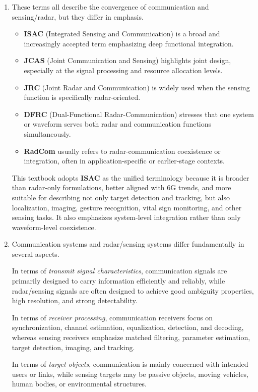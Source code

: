\begin{enumerate}[label=\textbf{\arabic*.}, leftmargin=*]
    \item 
    These terms all describe the convergence of communication and sensing/radar, but they differ in emphasis.

    \begin{itemize}
        \item \textbf{ISAC} (Integrated Sensing and Communication) is a broad and increasingly accepted term emphasizing deep functional integration.
        \item \textbf{JCAS} (Joint Communication and Sensing) highlights joint design, especially at the signal processing and resource allocation levels.
        \item \textbf{JRC} (Joint Radar and Communication) is widely used when the sensing function is specifically radar-oriented.
        \item \textbf{DFRC} (Dual-Functional Radar-Communication) stresses that one system or waveform serves both radar and communication functions simultaneously.
        \item \textbf{RadCom} usually refers to radar-communication coexistence or integration, often in application-specific or earlier-stage contexts.
    \end{itemize}

    This textbook adopts \textbf{ISAC} as the unified terminology because it is broader than radar-only formulations, better aligned with 6G trends, and more suitable for describing not only target detection and tracking, but also localization, imaging, gesture recognition, vital sign monitoring, and other sensing tasks. It also emphasizes system-level integration rather than only waveform-level coexistence.

    \item 
    Communication systems and radar/sensing systems differ fundamentally in several aspects.

    In terms of \emph{transmit signal characteristics}, communication signals are primarily designed to carry information efficiently and reliably, while radar/sensing signals are often designed to achieve good ambiguity properties, high resolution, and strong detectability.

    In terms of \emph{receiver processing}, communication receivers focus on synchronization, channel estimation, equalization, detection, and decoding, whereas sensing receivers emphasize matched filtering, parameter estimation, target detection, imaging, and tracking.

    In terms of \emph{target objects}, communication is mainly concerned with intended users or links, while sensing targets may be passive objects, moving vehicles, human bodies, or environmental structures.


\end{enumerate}
